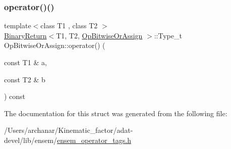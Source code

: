 \subsubsection{\texorpdfstring{operator()()}{operator()()}\hspace{0.1cm}{\footnotesize\ttfamily [3/3]}}
{\footnotesize\ttfamily template$<$class T1 , class T2 $>$ \\
\mbox{\hyperlink{structBinaryReturn}{Binary\+Return}}$<$T1, T2, \mbox{\hyperlink{structOpBitwiseOrAssign}{Op\+Bitwise\+Or\+Assign}} $>$\+::Type\+\_\+t Op\+Bitwise\+Or\+Assign\+::operator() (\begin{DoxyParamCaption}\item[{const T1 \&}]{a,  }\item[{const T2 \&}]{b }\end{DoxyParamCaption}) const\hspace{0.3cm}{\ttfamily [inline]}}



The documentation for this struct was generated from the following file\+:\begin{DoxyCompactItemize}
\item 
/\+Users/archanar/\+Kinematic\+\_\+factor/adat-\/devel/lib/ensem/\mbox{\hyperlink{adat-devel_2lib_2ensem_2ensem__operator__tags_8h}{ensem\+\_\+operator\+\_\+tags.\+h}}\end{DoxyCompactItemize}

